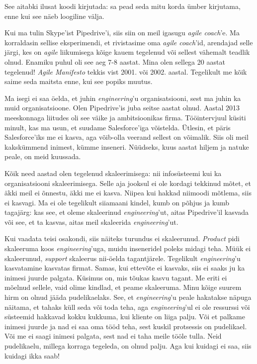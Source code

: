 See aitabki ilusat koodi kirjutada: sa 
pead seda mitu korda ümber kirjutama, enne kui see näeb loogiline välja.


Kui ma tulin Skype'ist Pipedrive'i, siis siin on meil 
igasugu \emph{agile coach}'e. Ma korraldasin sellise eksperimendi, et rivistasime oma 
\emph{agile coach}'id, arendajad selle järgi, kes on 
\emph{agile} liikumisega kõige kauem tegelenud või sellest vähemalt teadlik olnud. Enamiku puhul oli see aeg 7-8 aastat. Mina olen sellega 20 
aastat tegelenud! \emph{Agile Manifesto} tekkis vist 2001. või 
2002. aastal. Tegelikult me kõik saime seda maitsta enne, kui see popiks muutus.


Ma isegi ei saa öelda, et juhin \emph{engineering}'u 
organisatsiooni, sest ma juhin ka muid organisatsioone. Olen 
Pipedrive'is juba seitse aastat olnud. Aastal 
2013 meeskonnaga liitudes oli see väike ja ambitsioonikas firma. Tööintervjuul küsiti minult, kas ma usun, et suudame Salesforce'iga võistelda. Ütlesin, et päris 
Salesforce'iks me ei kasva, aga võib-olla veerand sellest on võimalik. Siis 
oli meil kakskümmend inimest, kümme inseneri. Nüüdseks, kuus aastat hiljem ja natuke peale, on meid kuussada.

Kõik need aastad olen tegelenud skaleerimisega: nii infosüsteemi kui ka 
organisatsiooni skaleerimisega. Selle aja jooksul ei ole kordagi tekkinud mõtet, et 
äkki meil ei õnnestu, äkki me ei kasva. Niipea kui hakkad niimoodi mõtlema, siis 
ei kasvagi. Ma ei ole tegelikult siiamaani kindel, kumb on põhjus ja 
kumb tagajärg: kas see, et oleme skaleerinud \emph{engineering}'ut, 
aitas Pipedrive'il kasvada või see, et ta kasvas, aitas meil skaleerida 
\emph{engineering}'ut.

Kui vaadata teisi osakondi, siis näiteks turundus ei skaleerunud. 
\emph{Product} pidi skaleeruma koos \emph{engineering}'uga, muidu inseneridel 
poleks midagi teha. Müük ei skaleerunud, \emph{support} skaleerus 
nii-öelda tagantjärele. Tegelikult \emph{engineering}'u kasvatamine 
kasvatas firmat. Samas, kui ettevõte ei kasvaks, siis ei saaks ju ka 
inimesi juurde palgata. Küsimus on, 
mis tõukas kasvu tagant. Me eriti ei mõelnud sellele, vaid olime 
kindlad, et peame skaleeruma. Minu kõige suurem hirm on olnud jääda pudelikaelaks. See, et \emph{engineering}'u peale hakatakse 
näpuga näitama, et tahaks küll seda või toda teha, aga 
\emph{engineering}'ul ei ole ressurssi või süsteemid hakkavad 
kokku kukkuma, kui kliente on liiga palju. Või et palkame inimesi juurde ja 
nad ei saa oma tööd teha, sest kuskil protsessis on pudelikael. 
Või me ei saagi inimesi palgata, sest nad ei taha meile tööle tulla. Neid 
pudelikaelu, millega korraga tegeleda, on olnud palju. Aga kui kuidagi ei saa, siis kuidagi ikka saab!
